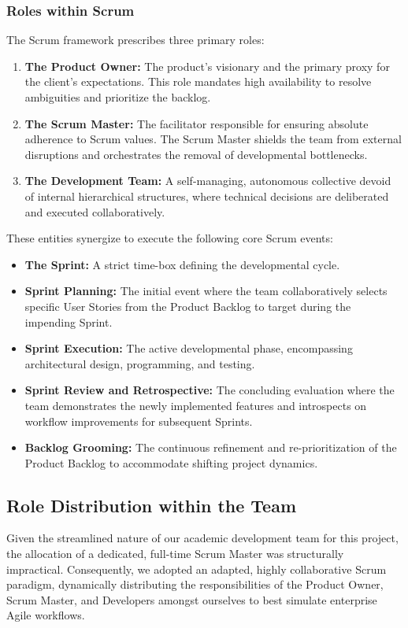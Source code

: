 \subsubsection{Roles within Scrum}
The Scrum framework prescribes three primary roles:
\begin{enumerate}[label=\arabic*)]
    \item \textbf{The Product Owner:} The product's visionary and the primary proxy for the client's expectations. This role mandates high availability to resolve ambiguities and prioritize the backlog.
    \item \textbf{The Scrum Master:} The facilitator responsible for ensuring absolute adherence to Scrum values. The Scrum Master shields the team from external disruptions and orchestrates the removal of developmental bottlenecks.
    \item \textbf{The Development Team:} A self-managing, autonomous collective devoid of internal hierarchical structures, where technical decisions are deliberated and executed collaboratively.
\end{enumerate}

These entities synergize to execute the following core Scrum events:
\begin{itemize}
    \item \textbf{The Sprint:} A strict time-box defining the developmental cycle.
    \item \textbf{Sprint Planning:} The initial event where the team collaboratively selects specific User Stories from the Product Backlog to target during the impending Sprint.
    \item \textbf{Sprint Execution:} The active developmental phase, encompassing architectural design, programming, and testing.
    \item \textbf{Sprint Review and Retrospective:} The concluding evaluation where the team demonstrates the newly implemented features and introspects on workflow improvements for subsequent Sprints.
    \item \textbf{Backlog Grooming:} The continuous refinement and re-prioritization of the Product Backlog to accommodate shifting project dynamics.
\end{itemize}

\subsection{Role Distribution within the Team}
Given the streamlined nature of our academic development team for this project, the allocation of a dedicated, full-time Scrum Master was structurally impractical. Consequently, we adopted an adapted, highly collaborative Scrum paradigm, dynamically distributing the responsibilities of the Product Owner, Scrum Master, and Developers amongst ourselves to best simulate enterprise Agile workflows.

